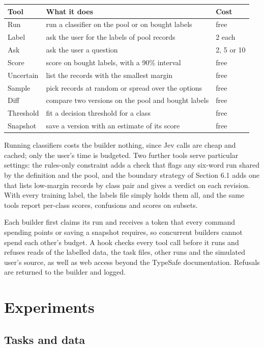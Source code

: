 \documentclass[11pt]{article}
\begin{document}
\begin{center}\small
\begin{tabularx}{\linewidth}{lLl}
\toprule
Tool & What it does & Cost \\
\midrule
Run & run a classifier on the pool or on bought labels & free \\
Label & ask the user for the labels of pool records & 2 each \\
Ask & ask the user a question & 2, 5 or 10 \\
Score & score on bought labels, with a 90\% interval & free \\
Uncertain & list the records with the smallest margin & free \\
Sample & pick records at random or spread over the options & free \\
Diff & compare two versions on the pool and bought labels & free \\
Threshold & fit a decision threshold for a class & free \\
Snapshot & save a version with an estimate of its score & free \\
\bottomrule
\end{tabularx}
\end{center}

Running classifiers costs the builder nothing, since Jev calls are cheap and cached; only the user's time is budgeted. Two further tools serve particular settings: the rules-only constraint adds a check that flags any six-word run shared by the definition and the pool, and the boundary strategy of Section 6.1 adds one that lists low-margin records by class pair and gives a verdict on each revision. With every training label, the labels file simply holds them all, and the same tools report per-class scores, confusions and scores on subsets.

Each builder first claims its run and receives a token that every command spending points or saving a snapshot requires, so concurrent builders cannot spend each other's budget. A hook checks every tool call before it runs and refuses reads of the labelled data, the task files, other runs and the simulated user's source, as well as web access beyond the TypeSafe documentation. Refusals are returned to the builder and logged.

\section{Experiments}

\subsection{Tasks and data}
\end{document}
